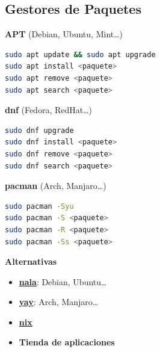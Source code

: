 \documentclass[aspectratio=43]{beamer}
\begin{document}
    \subsection{Gestores de Paquetes}
     \begin{frame}[fragile]{\subsecname}{}
        \begin{multicols}{2}
            \textbf{APT} (Debian, Ubuntu, Mint\ldots)\\
            \begin{lstlisting}[language=bash]
sudo apt update && sudo apt upgrade
sudo apt install <paquete>
sudo apt remove <paquete>
sudo apt search <paquete>\end{lstlisting}
            \textbf{dnf} (Fedora, RedHat\ldots)\\
            \begin{lstlisting}[language=bash]
sudo dnf upgrade
sudo dnf install <paquete>
sudo dnf remove <paquete>
sudo dnf search <paquete>\end{lstlisting}
            \newpage
            \textbf{pacman} (Arch, Manjaro\ldots)\\
            \begin{lstlisting}[language=bash]
sudo pacman -Syu
sudo pacman -S <paquete>
sudo pacman -R <paquete>
sudo pacman -Ss <paquete>\end{lstlisting}
            \textbf{Alternativas}
            \begin{itemize}
                \item \href{https://gitlab.com/volian/nala}{\underline{\textbf{nala}}}: Debian, Ubuntu\ldots
                \item \href{https://github.com/Jguer/yay}{\underline{\textbf{yay}}}: Arch, Manjaro\ldots
                \item \href{https://github.com/NixOS/nix}{\underline{\textbf{nix}}}
                \item \textbf{Tienda de aplicaciones}
            \end{itemize}
        \end{multicols}
    \end{frame}
\end{document}
